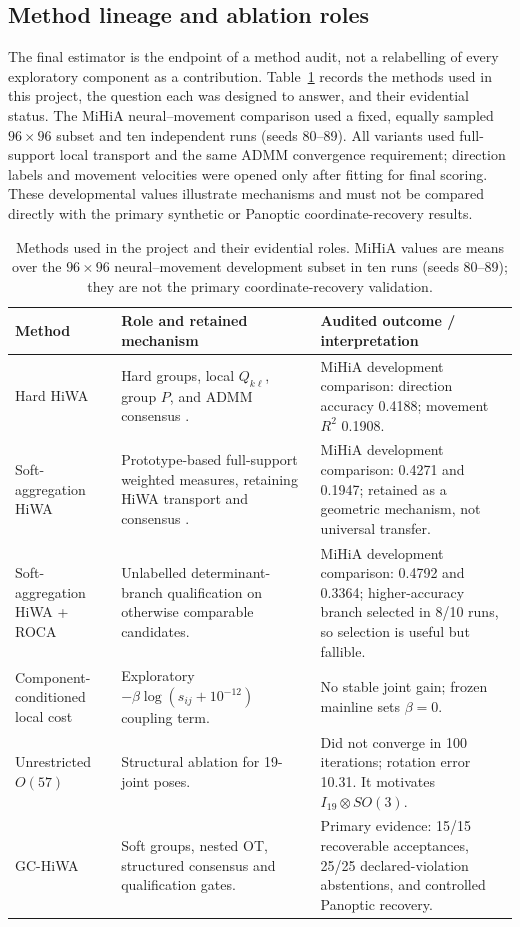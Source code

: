 \documentclass[10pt,a4paper]{article}
\begin{document}
\subsection{Method lineage and ablation roles}
The final estimator is the endpoint of a method audit, not a relabelling of every exploratory component as a contribution. Table~\ref{tab:en-lineage} records the methods used in this project, the question each was designed to answer, and their evidential status. The MiHiA neural--movement comparison used a fixed, equally sampled $96\times96$ subset and ten independent runs (seeds 80--89). All variants used full-support local transport and the same ADMM convergence requirement; direction labels and movement velocities were opened only after fitting for final scoring. These developmental values illustrate mechanisms and must not be compared directly with the primary synthetic or Panoptic coordinate-recovery results.
\begin{table}[H]\centering\small
\caption{Methods used in the project and their evidential roles. MiHiA values are means over the $96\times96$ neural--movement development subset in ten runs (seeds 80--89); they are not the primary coordinate-recovery validation.}\label{tab:en-lineage}
\begin{tabularx}{\linewidth}{l X X}\toprule
Method & Role and retained mechanism & Audited outcome / interpretation\\\midrule
Hard HiWA & Hard groups, local $Q_{k\ell}$, group $P$, and ADMM consensus \cite{lee2019hierarchical}. & MiHiA development comparison: direction accuracy 0.4188; movement $R^2$ 0.1908.\\
Soft-aggregation HiWA & Prototype-based full-support weighted measures, retaining HiWA transport and consensus \cite{lee2019hierarchical}. & MiHiA development comparison: 0.4271 and 0.1947; retained as a geometric mechanism, not universal transfer.\\
Soft-aggregation HiWA + ROCA & Unlabelled determinant-branch qualification on otherwise comparable candidates. & MiHiA development comparison: 0.4792 and 0.3364; higher-accuracy branch selected in 8/10 runs, so selection is useful but fallible.\\
Component-conditioned local cost & Exploratory $-\beta\log(s_{ij}+10^{-12})$ coupling term. & No stable joint gain; frozen mainline sets $\beta=0$.\\
Unrestricted $O(57)$ & Structural ablation for 19-joint poses. & Did not converge in 100 iterations; rotation error 10.31. It motivates $I_{19}\otimes SO(3)$.\\
GC-HiWA & Soft groups, nested OT, structured consensus and qualification gates. & Primary evidence: 15/15 recoverable acceptances, 25/25 declared-violation abstentions, and controlled Panoptic recovery.\\
\bottomrule\end{tabularx}
\end{table}
\end{document}
